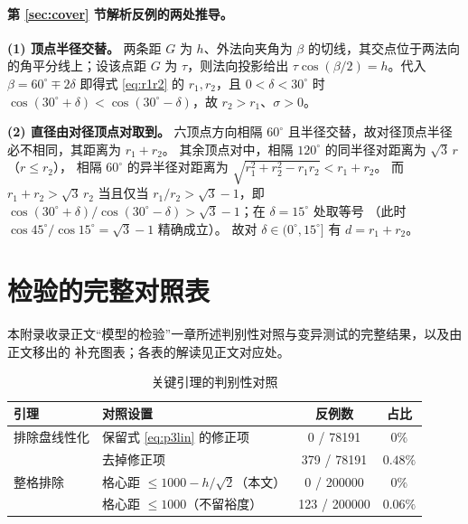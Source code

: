 \documentclass[withoutpreface, bwprint]{cumcmthesis}
\begin{document}
\begin{appendices}
\paragraph{第 \ref{sec:cover} 节解析反例的两处推导。}
\textbf{(1) 顶点半径交替。} 两条距 $G$ 为 $h$、外法向夹角为 $\beta$ 的切线，其交点位于两法向的角平分线上；设该点距 $G$ 为 $\tau$，则法向投影给出 $\tau\cos(\beta/2)=h$。代入 $\beta=60^\circ\mp2\delta$ 即得式 \eqref{eq:r1r2} 的 $r_1,r_2$，且 $0<\delta<30^\circ$ 时 $\cos(30^\circ+\delta)<\cos(30^\circ-\delta)$，故 $r_2>r_1$、$\sigma>0$。

\textbf{(2) 直径由对径顶点对取到。}
六顶点方向相隔 $60^\circ$ 且半径交替，故对径顶点半径必不相同，其距离为 $r_1+r_2$。
其余顶点对中，相隔 $120^\circ$ 的同半径对距离为 $\sqrt3\,r$（$r\le r_2$），
相隔 $60^\circ$ 的异半径对距离为 $\sqrt{r_1^2+r_2^2-r_1r_2}<r_1+r_2$。
而 $r_1+r_2>\sqrt3\,r_2$ 当且仅当 $r_1/r_2>\sqrt3-1$，即
$\cos(30^\circ+\delta)/\cos(30^\circ-\delta)>\sqrt3-1$；在 $\delta=15^\circ$ 处取等号
（此时 $\cos45^\circ/\cos15^\circ=\sqrt3-1$ 精确成立）。
故对 $\delta\in(0^\circ,15^\circ]$ 有 $d=r_1+r_2$。

\section{检验的完整对照表}
\label{app:check}

本附录收录正文“模型的检验”一章所述判别性对照与变异测试的完整结果，以及由正文移出的
补充图表；各表的解读见正文对应处。

\begin{table}[htbp]
  \centering
  \caption{关键引理的判别性对照}
  \label{tab:p3lemma}
  \begin{tabular}{llcc}
    \toprule
    引理 & 对照设置 & 反例数 & 占比 \\
    \midrule
    排除盘线性化 & 保留式 \eqref{eq:p3lin} 的修正项 & 0 / 78191 & $0\%$ \\
                 & 去掉修正项 & 379 / 78191 & $0.48\%$ \\
    整格排除 & 格心距 $\le 1000-h/\sqrt2$（本文） & 0 / 200000 & $0\%$ \\
             & 格心距 $\le 1000$（不留裕度） & 123 / 200000 & $0.06\%$ \\
    \bottomrule
  \end{tabular}
\end{table}


\end{appendices}
\end{document}
